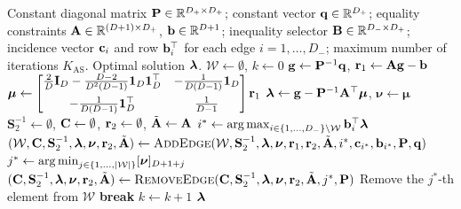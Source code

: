 \begin{algorithm}[t]
	\caption{Laplacian projection via Goldfarb--Idnani active-set method}
	\label{alg:active_set}
	\begin{algorithmic}[1]
		\renewcommand{\algorithmicrequire}{\textbf{Input:}}
		\renewcommand{\algorithmicensure}{\textbf{Output:}}
		\Require Constant diagonal matrix $\mathbf{P}\in\mathbb{R}^{D_+\times D_+}$; constant vector $\mathbf{q}\in\mathbb{R}^{D_+}$; equality constraints $\mathbf{A}\in\mathbb{R}^{(D+1)\times D_+}$, $\mathbf{b}\in\mathbb{R}^{D+1}$; inequality selector $\mathbf{B}\in\mathbb{R}^{D_-\times D_+}$; incidence vector $\mathbf{c}_i$ and row $\mathbf{b}_i^\top$ for each edge $i=1,\dots,D_-$; maximum number of iterations $K_\text{AS}$.
		\Ensure Optimal solution $\boldsymbol{\lambda}$.
		\State $\mathcal{W}\gets\emptyset$, $k\gets 0$
		\State $\mathbf{g}\gets\mathbf{P}^{-1}\mathbf{q}$, $\mathbf{r}_1\gets\mathbf{A}\mathbf{g}-\mathbf{b}$
		\State $\boldsymbol{\mu}\gets
		\begin{bmatrix}
			\frac{2}{D}\mathbf{I}_D-\frac{D-2}{D^2(D-1)}\mathbf{1}_D\mathbf{1}_D^\top & -\frac{1}{D(D-1)}\mathbf{1}_D\\[6pt]
			-\frac{1}{D(D-1)}\mathbf{1}_D^\top & \frac{1}{D-1}
		\end{bmatrix}\mathbf{r}_1$
		\State $\boldsymbol{\lambda}\gets\mathbf{g}-\mathbf{P}^{-1}\mathbf{A}^\top\boldsymbol{\mu}$, $\boldsymbol{\nu}\gets\boldsymbol{\mu}$
		\State $\mathbf{S}_2^{-1}\gets\emptyset$, $\mathbf{C}\gets\emptyset$, $\mathbf{r}_2\gets\emptyset$, $\tilde{\mathbf{A}}\gets\mathbf{A}$
		\State $i^\ast \gets \operatorname*{arg\,max}_{i\in\{1,\ldots,D_-\}\setminus\mathcal{W}} \mathbf{b}_i^\top \boldsymbol{\lambda}$
		\State $(\mathcal{W},\mathbf{C},\mathbf{S}_2^{-1},\boldsymbol{\lambda},\boldsymbol{\nu},\mathbf{r}_2,\tilde{\mathbf{A}})\gets\textsc{AddEdge}(\mathcal{W},\mathbf{S}_2^{-1},\boldsymbol{\lambda},\boldsymbol{\nu},\mathbf{r}_1,\mathbf{r}_2,\tilde{\mathbf{A}},i^\ast,\mathbf{c}_{i^\ast},\mathbf{b}_{i^\ast},\mathbf{P},\mathbf{q})$
		\Else
		\State $j^\ast \gets \operatorname*{arg\,min}_{j\in\{1,\dots,|\mathcal{W}|\}} [\boldsymbol{\nu}]_{D+1+j}$
		\State $(\mathbf{C},\mathbf{S}_2^{-1},\boldsymbol{\lambda},\boldsymbol{\nu},\mathbf{r}_2,\tilde{\mathbf{A}})\gets\textsc{RemoveEdge}(\mathbf{C},\mathbf{S}_2^{-1},\boldsymbol{\lambda},\boldsymbol{\nu},\mathbf{r}_2,\tilde{\mathbf{A}},j^\ast,\mathbf{P})$
		\State Remove the $j^\ast$-th element from $\mathcal{W}$
		\Else
		\State \textbf{break}
		\EndIf
		\EndIf
		\State $k\gets k+1$
		\EndWhile
		\Return $\boldsymbol{\lambda}$
	\end{algorithmic}
\end{algorithm}

